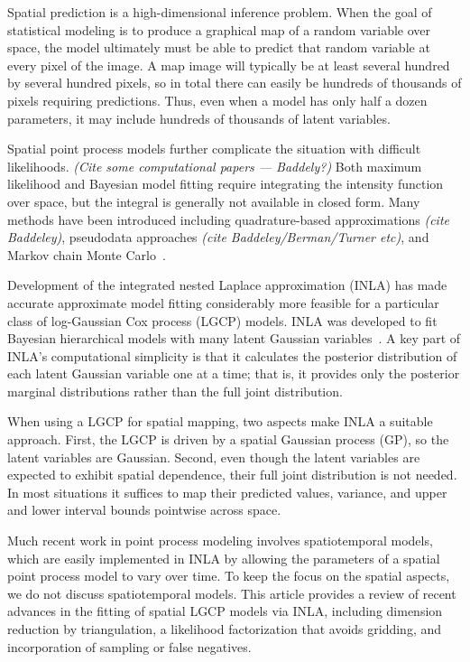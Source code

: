 \documentclass[]{interact}
\begin{document}
Spatial prediction is a high-dimensional inference problem. When the goal of
statistical modeling is to produce a graphical map of a random variable over
space, the model ultimately must be able to predict that random variable at
every pixel of the image. A map image will typically be at least several
hundred by several hundred pixels, so in total there can easily be hundreds of
thousands of pixels requiring predictions. Thus, even when a model has only
half a dozen parameters, it may include hundreds of thousands of latent
variables.

Spatial point process models further complicate the situation with difficult
likelihoods. {\it (Cite some computational papers --- Baddely?)} Both maximum
likelihood and Bayesian model fitting require integrating the intensity
function over space, but the integral is generally not available in closed
form. Many methods have been introduced including quadrature-based
approximations {\it (cite Baddeley)}, pseudodata approaches
{\it (cite Baddeley/Berman/Turner etc)}, and Markov chain Monte
Carlo~\cite{moellerwaagepetersen}.

Development of the integrated nested Laplace approximation (INLA) has made
accurate approximate model fitting considerably more feasible for a particular
class of log-Gaussian Cox process (LGCP) models. INLA was developed to fit
Bayesian hierarchical models with many latent Gaussian
variables~\cite{rueetal}. A key part of INLA's computational simplicity is that
it calculates the posterior distribution of each latent Gaussian variable one
at a time; that is, it provides only the posterior marginal distributions
rather than the full joint distribution.

When using a LGCP for spatial mapping, two aspects make INLA a suitable
approach. First, the LGCP is driven by a spatial Gaussian process (GP), so the
latent variables are Gaussian. Second, even though the latent variables are
expected to exhibit spatial dependence, their full joint distribution is not
needed. In most situations it suffices to map their predicted values, variance,
and upper and lower interval bounds pointwise across space.

Much recent work in point process modeling involves spatiotemporal models,
which are easily implemented in INLA by allowing the parameters of a spatial
point process model to vary over time. To keep the focus on the spatial
aspects, we do not discuss spatiotemporal models. This article provides a
review of recent advances in the fitting of spatial LGCP models via INLA,
including dimension reduction by triangulation, a likelihood factorization that
avoids gridding, and incorporation of sampling or false negatives.
\end{document}
